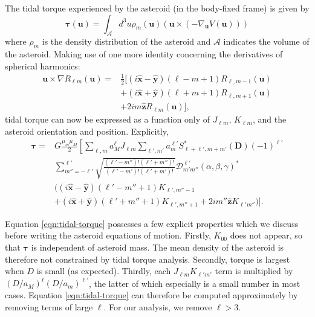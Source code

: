 \documentclass[fleqn,usenatbib]{mnras}
\newcommand{\unit}[1]{\bm{\hat{#1}}}
\begin{document}
The tidal torque experienced by the asteroid (in the body-fixed frame) is given by
\begin{equation}
  \bm{\tau}(\bm u) = \int_\mathcal{A} d^3 u \rho_m(\bm u) (\bm u \times (-\nabla_{\bm u} V(\bm u)))
\end{equation}
where $\rho_m$ is the density distribution of the asteroid and $\mathcal{A}$ indicates the volume of the asteroid. Making use of one more identity concerning the derivatives of spherical harmonics:
\begin{equation}
  \begin{split}
  \bm u \times \nabla R_{\ell m}(\bm u)=&\frac{1}{2}\Big[(i\unit x - \unit y)(\ell-m+1)R_{\ell,m-1}(\bm u)\\
  &+(i\unit x+\unit y)(\ell+m+1)R_{\ell,m+1}(\bm u)\\
  & +2im\unit z R_{\ell m}(\bm u)\Big],
  \end{split}
\end{equation}
tidal torque can now be expressed as a function only of $J_{\ell m}$, $K_{\ell m}$, and the asteroid orientation and position. Explicitly,
\begin{equation}
  \begin{split}
  \bm \tau = &G\frac{\mu_m\mu_M}{2}\left[\sum_{\ell, m} a_M^\ell J_{\ell m} \sum_{\ell', m'}a_m^{\ell'}S^*_{\ell+\ell', m + m'} (\bm D) (-1)^{\ell'}\right.\\
  &\left.\sum_{m''=-\ell'}^{\ell'} \sqrt{\frac{(\ell'-m'')!(\ell'+m'')!}{(\ell'-m')!(\ell'+m')!}}  \mathcal{D}^{\ell'}_{m'm''}(\alpha, \beta, \gamma)^* \right. \\
  &\Big((i\unit x - \unit y)(\ell'-m''+1)K_{\ell',m''-1} \\
  &+(i\unit x+\unit y)(\ell'+m''+1)K_{\ell',m''+1}+2im''\unit z K_{\ell'm''}\Big) \Bigg].
  \end{split}
  \label{eqn:tidal-torque}
\end{equation}

Equation \ref{eqn:tidal-torque} possesses a few explicit properties which we discuss before writing the asteroid equations of motion. Firstly, $K_{00}$ does not appear, so that $\bm \tau$ is independent of asteroid mass. The mean density of the asteroid is therefore not constrained by tidal torque analysis. Secondly, torque is largest when $D$ is small (as expected). Thirdly, each $J_{\ell m}K_{\ell' m'}$ term is multiplied by $(D/a_M)^\ell (D/a_m)^{\ell'}$, the latter of which especially is a small number in most cases. Equation \ref{eqn:tidal-torque} can therefore be computed approximately by removing terms of large $\ell$. For our analysis, we remove $\ell > 3$.
\end{document}
